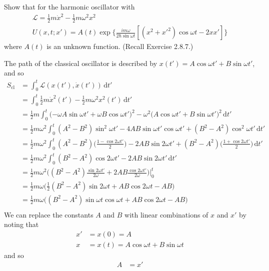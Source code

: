 \documentclass[../principles-of-quantum-mechanics.tex]{subfiles}
\begin{document}
\begin{questions}
		\question Show that for the harmonic oscillator with
		\begin{gather*}
			\mathcal{L} = \frac{1}{2}m\dot{x}^2 - \frac{1}{2}m\omega^2x^2 \\
			U(x, t; x') = A(t)\exp\Big\{\frac{im\omega}{2\hbar\sin \omega t}[(x^2 + x'^2)\cos \omega t - 2xx']\Big\}
		\end{gather*}
		where $A(t)$ is an unknown function. (Recall Exercise 2.8.7.)
		\begin{solution}
			The path of the classical oscillator is described by $x(t') = A\cos\omega t' + B\sin\omega t'$, and so
			\begin{align*}
				S_{\text{cl}} &= \int_0^t\mathcal{L}(x(t'), \dot{x}(t'))\,\mathrm{d}t' \\
				&= \int_0^t \frac{1}{2}m\dot{x}^2(t') - \frac{1}{2}m\omega^2x^2(t')\,\mathrm{d}t' \\
				&= \frac{1}{2}m\int_0^t\Big({-\omega A\sin\omega t'} + \omega B \cos \omega t'\Big)^2 - \omega^2\Big(A\cos\omega t' + B\sin\omega t'\Big)^2\,\mathrm{d}t' \\
				&= \frac{1}{2}m\omega^2\int_0^t (A^2 - B^2)\sin^2\omega t' - 4AB\sin\omega t' \cos\omega t' + (B^2 - A^2)\cos^2\omega t'\,\mathrm{d}t' \\
				&= \frac{1}{2}m\omega^2\int_0^t(A^2 - B^2)\Big(\frac{1 - \cos2\omega t'}{2}\Big) - 2AB\sin 2 \omega t' + (B^2 - A^2)\Big(\frac{1 + \cos 2 \omega t'}{2}\Big)\,\mathrm{d}t' \\
				&= \frac{1}{2}m\omega^2 \int_0^t (B^2 - A^2)\cos 2 \omega t' - 2AB\sin 2 \omega t'\,\mathrm{d}t' \\
				&= \frac{1}{2}m\omega^2\Big((B^2 - A^2)\frac{\sin2\omega t'}{2\omega} + 2AB\frac{\cos 2 \omega t'}{2\omega}\Big)\Big|_0^t \\
				&= \frac{1}{2}m\omega\Big(\frac{1}{2}(B^2 - A^2)\sin2\omega t + AB\cos2\omega t - AB\Big) \\
				&= \frac{1}{2}m\omega\Big((B^2 - A^2)\sin\omega t\cos\omega t + AB\cos2\omega t - AB\Big) \\
			\end{align*}
			We can replace the constants $A$ and $B$ with linear combinations of $x$ and $x'$ by noting that
			\begin{align*}
				x' &= x(0) = A \\
				x &= x(t) = A\cos\omega t + B\sin\omega t
			\end{align*}
			and so 
			\begin{align*}
				A &= x' \\

\end{align*}
\end{solution}
\end{questions}
\end{document}
